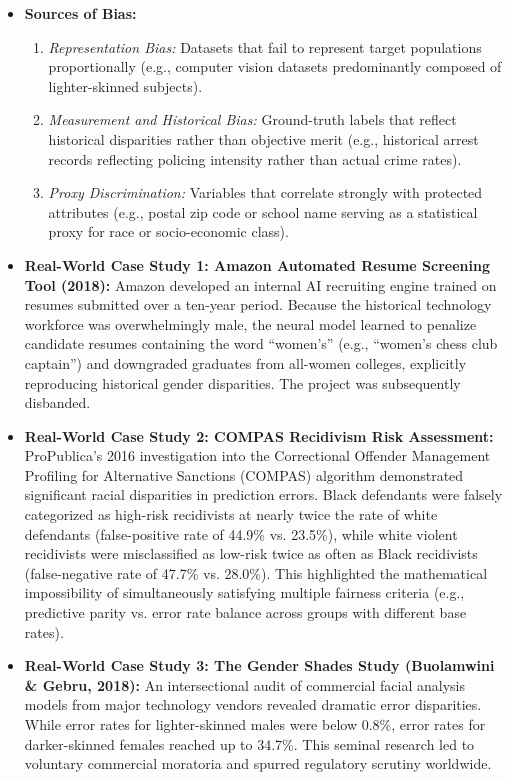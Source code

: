 \documentclass[12pt,a4paper]{article}
\begin{document}
\begin{itemize}[leftmargin=*]
    \item \textbf{Sources of Bias:}
    \begin{enumerate}
        \item \textit{Representation Bias:} Datasets that fail to represent target populations proportionally (e.g., computer vision datasets predominantly composed of lighter-skinned subjects).
        \item \textit{Measurement and Historical Bias:} Ground-truth labels that reflect historical disparities rather than objective merit (e.g., historical arrest records reflecting policing intensity rather than actual crime rates).
        \item \textit{Proxy Discrimination:} Variables that correlate strongly with protected attributes (e.g., postal zip code or school name serving as a statistical proxy for race or socio-economic class).
    \end{enumerate}
    \item \textbf{Real-World Case Study 1: Amazon Automated Resume Screening Tool (2018):} Amazon developed an internal AI recruiting engine trained on resumes submitted over a ten-year period. Because the historical technology workforce was overwhelmingly male, the neural model learned to penalize candidate resumes containing the word ``women's'' (e.g., ``women's chess club captain'') and downgraded graduates from all-women colleges, explicitly reproducing historical gender disparities. The project was subsequently disbanded.
    \item \textbf{Real-World Case Study 2: COMPAS Recidivism Risk Assessment:} ProPublica's 2016 investigation into the Correctional Offender Management Profiling for Alternative Sanctions (COMPAS) algorithm demonstrated significant racial disparities in prediction errors. Black defendants were falsely categorized as high-risk recidivists at nearly twice the rate of white defendants (false-positive rate of 44.9\% vs. 23.5\%), while white violent recidivists were misclassified as low-risk twice as often as Black recidivists (false-negative rate of 47.7\% vs. 28.0\%). This highlighted the mathematical impossibility of simultaneously satisfying multiple fairness criteria (e.g., predictive parity vs. error rate balance across groups with different base rates).
    \item \textbf{Real-World Case Study 3: The Gender Shades Study (Buolamwini \& Gebru, 2018):} An intersectional audit of commercial facial analysis models from major technology vendors revealed dramatic error disparities. While error rates for lighter-skinned males were below 0.8\%, error rates for darker-skinned females reached up to 34.7\%. This seminal research led to voluntary commercial moratoria and spurred regulatory scrutiny worldwide.

\end{itemize}
\end{document}

